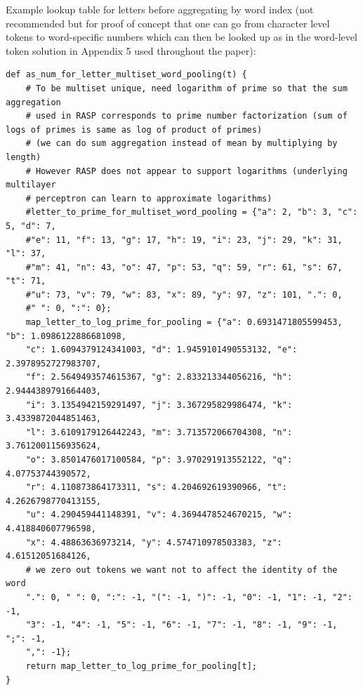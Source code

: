 \documentclass[11pt]{article}
\begin{document}
Example lookup table for letters before aggregating by word index (not recommended but for proof of concept that one can go from character level tokens to word-specific numbers which can then be looked up as in the word-level token solution in Appendix 5 used throughout the paper):
\clearpage
\begin{tiny}
\begin{verbatim}
def as_num_for_letter_multiset_word_pooling(t) {
    # To be multiset unique, need logarithm of prime so that the sum aggregation
    # used in RASP corresponds to prime number factorization (sum of logs of primes is same as log of product of primes) 
    # (we can do sum aggregation instead of mean by multiplying by length)
    # However RASP does not appear to support logarithms (underlying multilayer 
    # perceptron can learn to approximate logarithms)
    #letter_to_prime_for_multiset_word_pooling = {"a": 2, "b": 3, "c": 5, "d": 7, 
    #"e": 11, "f": 13, "g": 17, "h": 19, "i": 23, "j": 29, "k": 31, "l": 37, 
    #"m": 41, "n": 43, "o": 47, "p": 53, "q": 59, "r": 61, "s": 67, "t": 71, 
    #"u": 73, "v": 79, "w": 83, "x": 89, "y": 97, "z": 101, ".": 0, 
    #" ": 0, ":": 0};
    map_letter_to_log_prime_for_pooling = {"a": 0.6931471805599453, "b": 1.0986122886681098, 
    "c": 1.6094379124341003, "d": 1.9459101490553132, "e": 2.3978952727983707, 
    "f": 2.5649493574615367, "g": 2.833213344056216, "h": 2.9444389791664403, 
    "i": 3.1354942159291497, "j": 3.367295829986474, "k": 3.4339872044851463, 
    "l": 3.6109179126442243, "m": 3.713572066704308, "n": 3.7612001156935624, 
    "o": 3.8501476017100584, "p": 3.970291913552122, "q": 4.07753744390572, 
    "r": 4.110873864173311, "s": 4.204692619390966, "t": 4.2626798770413155, 
    "u": 4.290459441148391, "v": 4.3694478524670215, "w": 4.418840607796598, 
    "x": 4.48863636973214, "y": 4.574710978503383, "z": 4.61512051684126,
    # we zero out tokens we want not to affect the identity of the word
    ".": 0, " ": 0, ":": -1, "(": -1, ")": -1, "0": -1, "1": -1, "2": -1, 
    "3": -1, "4": -1, "5": -1, "6": -1, "7": -1, "8": -1, "9": -1, ";": -1, 
    ",": -1};
    return map_letter_to_log_prime_for_pooling[t];
}
\end{verbatim}
\end{tiny}
\end{document}
